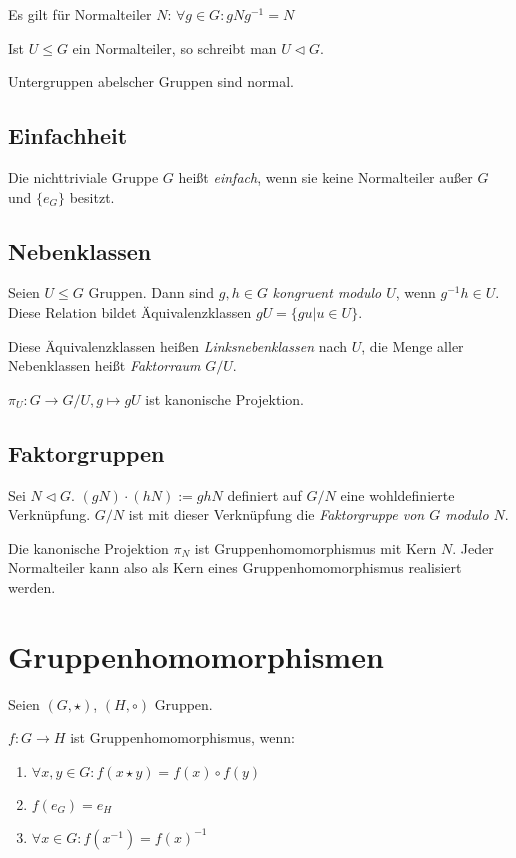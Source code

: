 Es gilt für Normalteiler $N$: $\forall g \in G : gNg^{-1} = N$

Ist $U \leq G$ ein Normalteiler, so schreibt man $U \triangleleft G$.

Untergruppen abelscher Gruppen sind normal.

\subsection*{Einfachheit}

Die nichttriviale Gruppe $G$ heißt \emph{einfach}, wenn sie keine Normalteiler außer $G$ und $\{e_G\}$ besitzt.

\subsection*{Nebenklassen}

Seien $U \leq G$ Gruppen. Dann sind $g, h \in G$ \emph{kongruent modulo $U$}, wenn $g^{-1}h \in U$. Diese Relation bildet Äquivalenzklassen $gU = \{gu | u \in U\}$.

Diese Äquivalenzklassen heißen \emph{Linksnebenklassen} nach $U$, die Menge aller Nebenklassen heißt \emph{Faktorraum} $G/U$.

$\pi_U : G \rightarrow G/U, g \mapsto gU$ ist kanonische Projektion.

\subsection*{Faktorgruppen}

Sei $N \triangleleft G$. $(gN) \cdot (hN) := ghN$ definiert auf $G/N$ eine wohldefinierte Verknüpfung. $G/N$ ist mit dieser Verknüpfung die \emph{Faktorgruppe von $G$ modulo $N$}.

Die kanonische Projektion $\pi_N$ ist Gruppenhomomorphismus mit Kern $N$. Jeder Normalteiler kann also als Kern eines Gruppenhomomorphismus realisiert werden.

\section*{Gruppenhomomorphismen}

Seien $(G,\star)$, $(H,\circ)$ Gruppen.

$f : G \rightarrow H$ ist Gruppenhomomorphismus, wenn:

\begin{enumerate}[label=(\alph*)]
	\item $\forall x, y \in G : f(x \star y) = f(x) \circ f(y)$
	\item $f(e_G) = e_H$
	\item $\forall x \in G : f(x^{-1}) = f(x)^{-1}$
\end{enumerate}

